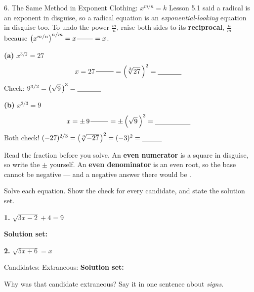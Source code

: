 \documentclass[10pt]{article}
\begin{document}
\begin{notesbox}{6. The Same Method in Exponent Clothing: $x^{m/n}=k$}
Lesson 5.1 said a radical is an exponent in disguise, so a radical equation is an
\emph{exponential-looking} equation in disguise too. To undo the power $\frac{m}{n}$, raise both
sides to its \textbf{reciprocal}, $\frac{n}{m}$ --- because
$\left(x^{m/n}\right)^{n/m}=x^{\,\blank{0.8cm}}=x$.
\begin{center}
\begin{minipage}[t]{0.46\linewidth}
\small
\textbf{(a)} \; $x^{3/2}=27$
\[ x=27^{\,\blank{0.9cm}}=\left(\sqrt[3]{27}\,\right)^{2}=\blank{1.2cm} \]
Check: $9^{3/2}=\left(\sqrt{9}\,\right)^{3}=\blank{1.2cm}$ \; \checkmark
\end{minipage}
\hfill
\begin{minipage}[t]{0.50\linewidth}
\small
\textbf{(b)} \; $x^{2/3}=9$
\[ x=\pm\,9^{\,\blank{0.9cm}}=\pm\left(\sqrt{9}\,\right)^{3}=\blank{1.8cm} \]
Both check! $(-27)^{2/3}=\left(\sqrt[3]{-27}\,\right)^{2}=(-3)^{2}=\blank{1.0cm}$
\end{minipage}
\end{center}
\vspace{3pt}
\begin{center}
\begin{tcolorbox}[colback=goldbg, colframe=goldacc, boxrule=0.7pt, arc=1.5mm, width=0.94\linewidth,
    left=3mm, right=3mm, top=1.5mm, bottom=1.5mm]
\small Read the fraction before you solve. An \textbf{even numerator} is a square in disguise, so
write the $\pm$ yourself. An \textbf{even denominator} is an even root, so the base cannot be
negative --- and a negative answer there would be \blank{2.6cm}.
\end{tcolorbox}
\end{center}
\end{notesbox}

\begin{practicebox}
Solve each equation. Show the check for every candidate, and state the solution set.

\vspace{4pt}
\textbf{1.} $\sqrt{3x-2}+4=9$
\vspace{0.55in}

\textbf{Solution set:} \blank{3.0cm}

\vspace{6pt}
\textbf{2.} $\sqrt{5x+6}=x$
\vspace{0.85in}

Candidates: \blank{3.0cm} \quad Extraneous: \blank{2.4cm} \quad \textbf{Solution set:}
\blank{2.4cm}

\vspace{4pt}
Why was that candidate extraneous? Say it in one sentence about \emph{signs}. \writeline
\end{practicebox}
\end{document}

